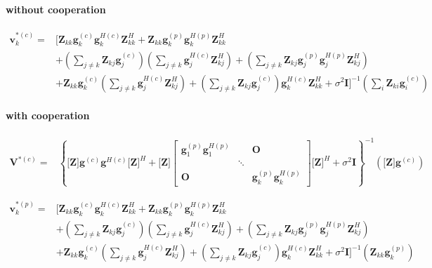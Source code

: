 \documentclass[11pt, oneside]{article}   	%
\begin{document}
\paragraph{without cooperation}


\begin{align*}
\textbf{v}^{*(c)}_{k} = 
&\bigg[
\textbf{Z}_{kk}	\textbf{g}^{(c)}_{k}	\textbf{g}^{H(c)}_{k}	\textbf{Z}^{H}_{kk}
+\textbf{Z}_{kk}	\textbf{g}^{(p)}_{k}	\textbf{g}^{H(p)}_{k}	\textbf{Z}^{H}_{kk}	\\
&+(\displaystyle\sum_{j \neq k}\textbf{Z}_{kj}\textbf{g}^{(c)}_{j})
(\displaystyle\sum_{j \neq k}\textbf{g}^{H(c)}_{j}\textbf{Z}^{H}_{kj})
+(\displaystyle\sum_{j \neq k}\textbf{Z}_{kj}\textbf{g}^{(p)}_{j}	\textbf{g}^{H(p)}_{j}\textbf{Z}^{H}_{kj})	\\
&+\textbf{Z}_{kk}	\textbf{g}^{(c)}_{k}
(\displaystyle\sum_{j \neq k}\textbf{g}^{H(c)}_{j}\textbf{Z}^{H}_{kj})
+(\displaystyle\sum_{j \neq k}\textbf{Z}_{kj}\textbf{g}^{(c)}_{j})
\textbf{g}^{H(c)}_{k}	\textbf{Z}^{H}_{kk}
+\sigma^2	\textbf{I}
\bigg]
^{-1}	 (	\displaystyle\sum_{i}   \textbf{Z}_{ki} 	\textbf{g}^{(c)}_{i}	)
\end{align*}






\paragraph{with cooperation}


\begin{align*}
\textbf{V}^{*(c)} =  		
&\left\{ 
\textbf{[Z]}	\textbf{g}^{(c)}	\textbf{g}^{H(c)}		\textbf{[Z]}^{H}
+\textbf{[Z]}
\begin{bmatrix}
       \textbf{g}^{(p)}_{1}	\textbf{g}^{H(p)}_{1} &  &   \textbf{O}      \\[0.3em]
        & \ddots       & \\[0.3em]
           \textbf{O}        & & \textbf{g}^{(p)}_{k}	\textbf{g}^{H(p)}_{k}
     \end{bmatrix}
    \textbf{[Z]}^{H}
    +\sigma^2	\textbf{I}
\right\}
^{-1} ( \textbf{[Z]}  \textbf{g}^{(c)}	)	
\end{align*}

\begin{align*}
\textbf{v}^{*(p)}_{k} =	
 &\bigg[
\textbf{Z}_{kk}	\textbf{g}^{(c)}_{k}	\textbf{g}^{H(c)}_{k}	\textbf{Z}^{H}_{kk}
+\textbf{Z}_{kk}	\textbf{g}^{(p)}_{k}	\textbf{g}^{H(p)}_{k}	\textbf{Z}^{H}_{kk}	\\
&+(\displaystyle\sum_{j \neq k}\textbf{Z}_{kj}\textbf{g}^{(c)}_{j})
(\displaystyle\sum_{j \neq k}\textbf{g}^{H(c)}_{j}\textbf{Z}^{H}_{kj})
+(\displaystyle\sum_{j \neq k}\textbf{Z}_{kj}\textbf{g}^{(p)}_{j}	\textbf{g}^{H(p)}_{j}\textbf{Z}^{H}_{kj})	\\
&+\textbf{Z}_{kk}	\textbf{g}^{(c)}_{k}
(\displaystyle\sum_{j \neq k}\textbf{g}^{H(c)}_{j}\textbf{Z}^{H}_{kj})
+(\displaystyle\sum_{j \neq k}\textbf{Z}_{kj}\textbf{g}^{(c)}_{j})
\textbf{g}^{H(c)}_{k}	\textbf{Z}^{H}_{kk}
+\sigma^2	\textbf{I}
\bigg]^{-1}	 (\textbf{Z}_{kk}  \textbf{g}^{(p)}_{k})
\end{align*}
\end{document}
